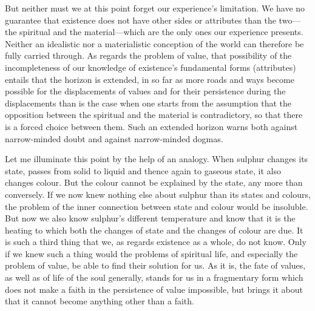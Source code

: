 \documentclass[12pt,a4paper]{book}
\newcommand{\opage}[1]{\marginnote{\footnotesize\textit{[#1]}}}
\begin{document}
But neither must we at this point forget our experience's limitation. We have no guarantee that existence
does not have other sides or attributes than the two---the spiritual and the material---which are the only
ones our experience presents. Neither an idealistic nor a materialistic conception of the world can
therefore be fully carried through. As regards the problem of value, 
\opage{178}that possibility of the incompleteness
of our knowledge of existence's fundamental forms (attributes) entails that the horizon is extended, in so
far as more roads and ways become possible for the displacements of values and for their persistence
during the displacements than is the case when one starts from the assumption that the opposition between
the spiritual and the material is contradictory, so that there is a forced choice between them. Such an
extended horizon warns both against narrow-minded doubt and against narrow-minded dogmas.

Let me illuminate this point by the help of an analogy. When sulphur changes its state, passes from solid
to liquid and thence again to gaseous state, it also changes colour. But the colour cannot be explained by
the state, any more than conversely. If we now knew nothing else about sulphur than its states and colours,
the problem of the inner connection between state and colour would be insoluble. But now we also know
sulphur's different temperature and know that it is the heating to which both the changes of state and the
changes of colour are due. It is such a third thing that we, as regards existence as a whole, do not know.
Only if we knew such a thing would the problems of spiritual life, and especially the problem of value, be
able to find their solution for us. As it is, the fate of values, as well as of life of the soul generally,
stands for us in a fragmentary form which does not make a faith in the persistence of value impossible, but
brings it about that it cannot become anything other than a faith.

\medskip
\end{document}
